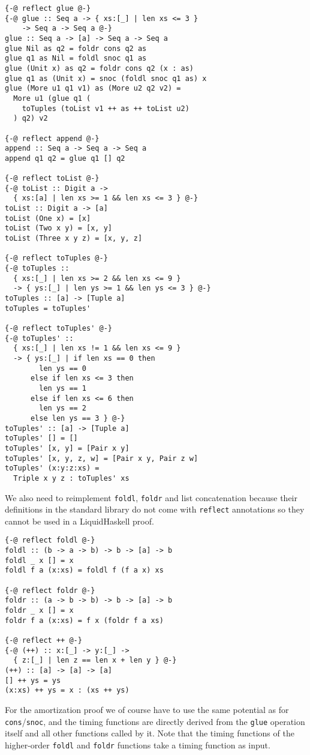 \documentclass[sigplan,screen]{acmart}
\begin{document}
\begin{lstlisting}
{-@ reflect glue @-}
{-@ glue :: Seq a -> { xs:[_] | len xs <= 3 }
    -> Seq a -> Seq a @-}
glue :: Seq a -> [a] -> Seq a -> Seq a
glue Nil as q2 = foldr cons q2 as
glue q1 as Nil = foldl snoc q1 as
glue (Unit x) as q2 = foldr cons q2 (x : as)
glue q1 as (Unit x) = snoc (foldl snoc q1 as) x
glue (More u1 q1 v1) as (More u2 q2 v2) =
  More u1 (glue q1 (
    toTuples (toList v1 ++ as ++ toList u2)
  ) q2) v2

{-@ reflect append @-}
append :: Seq a -> Seq a -> Seq a
append q1 q2 = glue q1 [] q2

{-@ reflect toList @-}
{-@ toList :: Digit a ->
  { xs:[a] | len xs >= 1 && len xs <= 3 } @-}
toList :: Digit a -> [a]
toList (One x) = [x]
toList (Two x y) = [x, y]
toList (Three x y z) = [x, y, z]

{-@ reflect toTuples @-}
{-@ toTuples ::
  { xs:[_] | len xs >= 2 && len xs <= 9 }
  -> { ys:[_] | len ys >= 1 && len ys <= 3 } @-}
toTuples :: [a] -> [Tuple a]
toTuples = toTuples'

{-@ reflect toTuples' @-}
{-@ toTuples' ::
  { xs:[_] | len xs != 1 && len xs <= 9 }
  -> { ys:[_] | if len xs == 0 then
        len ys == 0
      else if len xs <= 3 then
        len ys == 1
      else if len xs <= 6 then
        len ys == 2
      else len ys == 3 } @-}
toTuples' :: [a] -> [Tuple a]
toTuples' [] = []
toTuples' [x, y] = [Pair x y]
toTuples' [x, y, z, w] = [Pair x y, Pair z w]
toTuples' (x:y:z:xs) =
  Triple x y z : toTuples' xs
\end{lstlisting}

We also need to reimplement \texttt{foldl}, \texttt{foldr} and list concatenation because their definitions in the standard library do not come with \texttt{reflect} annotations so they cannot be used in a LiquidHaskell proof.

\begin{lstlisting}
{-@ reflect foldl @-}
foldl :: (b -> a -> b) -> b -> [a] -> b
foldl _ x [] = x
foldl f a (x:xs) = foldl f (f a x) xs

{-@ reflect foldr @-}
foldr :: (a -> b -> b) -> b -> [a] -> b
foldr _ x [] = x
foldr f a (x:xs) = f x (foldr f a xs)

{-@ reflect ++ @-}
{-@ (++) :: x:[_] -> y:[_] ->
  { z:[_] | len z == len x + len y } @-}
(++) :: [a] -> [a] -> [a]
[] ++ ys = ys
(x:xs) ++ ys = x : (xs ++ ys)
\end{lstlisting}

For the amortization proof we of course have to use the same potential as for \texttt{cons}/\texttt{snoc}, and the timing functions are directly derived from the \texttt{glue} operation itself and all other functions called by it. Note that the timing functions of the higher-order \texttt{foldl} and \texttt{foldr} functions take a timing function as input.
\end{document}

